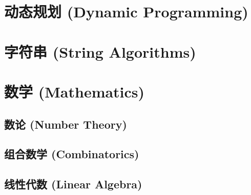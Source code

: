 \documentclass[a4paper]{article}
\begin{document}




\section{动态规划 (Dynamic Programming)}



\section{字符串 (String Algorithms)}







\section{数学 (Mathematics)}

\subsection{数论 (Number Theory)}










\subsection{组合数学 (Combinatorics)}






\subsection{线性代数 (Linear Algebra)}
\end{document}
